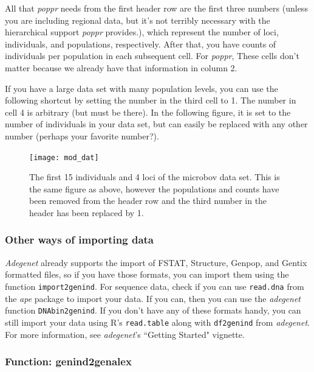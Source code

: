 \documentclass[letterpaper]{article}
\newcommand{\tab}{\hspace*{1em}}
\begin{document}
\newpage
All that \textit{poppr} needs from the first header row are the first three numbers (unless you are including regional data, but it's not terribly necessary with the hierarchical support \textit{poppr} provides.), which represent the number of loci, individuals, and populations, respectively. After that, you have counts of individuals per population in each subsequent cell. For \textit{poppr}, These cells don't matter because we already have that information in column 2.

If you have a large data set with many population levels, you can use the following shortcut by setting the number in the third cell to 1. The number in cell 4 is arbitrary (but must be there). In the following figure, it is set to the number of individuals in your data set, but can easily be replaced with any other number (perhaps your favorite number?). 

\begin{figure}[h!]
  \centering
  \caption{\footnotesize \footnotesize The first 15 individuals and 4 loci of the microbov data set. This is the same figure as above, however the populations and counts have been removed from the header row and the third number in the header has been replaced by 1.}
\texttt{[image: mod\_dat]}
\end{figure}


\subsubsection{Other ways of importing data}\label{intro:import:other}

\tab\tab \textit{Adegenet} already supports the import of FSTAT, Structure, Genpop, and Gentix formatted files, so if you have those formats, you can import them using the function \texttt{import2genind}. For sequence data, check if you can use \texttt{read.dna} from the \textit{ape} package to import your data. If you can, then you can use the \textit{adegenet} function \texttt{DNAbin2genind}. If you don't have any of these formats handy, you can still import your data using R's \texttt{read.table} along with \texttt{df2genind} from \textit{adegenet}. For more information, see \textit{adegenet}'s ``Getting Started" vignette.

\subsubsection{Function: genind2genalex}\label{intro:import:genind2genalex}
\end{document}
